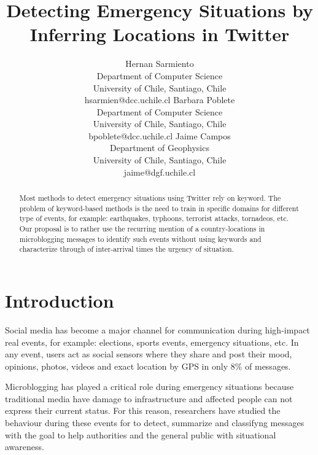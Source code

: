 \documentclass[letterpaper]{article} %
\begin{document}
%
\title{Detecting Emergency Situations by Inferring Locations in Twitter}
\author{Hernan Sarmiento\\ Department of Computer Science \\ University of Chile, Santiago, Chile \\ hsarmien@dcc.uchile.cl	
	\And Barbara Poblete\\ Department of Computer Science \\ University of Chile, Santiago, Chile \\ bpoblete@dcc.uchile.cl
	\And Jaime Campos \\ Department of Geophysics \\ University of Chile, Santiago, Chile \\ jaime@dgf.uchile.cl
}

\maketitle
\begin{abstract}
Most methods to detect emergency situations using Twitter rely on keyword. The problem of keyword-based methods is the need to train in specific domains for different type of events, for example: earthquakes, typhoons, terrorist attacks, tornadeos, etc.
Our proposal is to rather use the recurring mention of a country-locations in microblogging messages to identify such events without using keywords and characterize through of inter-arrival times the urgency of situation.
\end{abstract}

\noindent
\section{Introduction}

Social media has become a major channel for communication during high-impact real events, for example: elections, sports events, emergency situations, etc. In any event, users act as social sensors where they share and post their mood, opinions, photos, videos and exact location by GPS in only $8\%$ of messages.

Microblogging has played a critical role during emergency situations because traditional media have damage to infrastructure and affected people can not express their current status. For this reason, researchers have studied the behaviour during these events for to detect, summarize and classifyng messages with the goal to help authorities and the general public with situational awareness.
\end{document}
